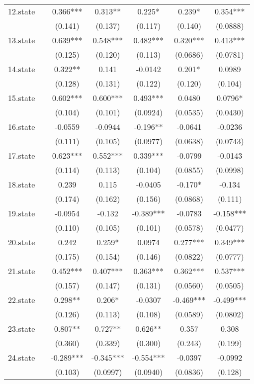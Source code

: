 \documentclass[]{article}
\begin{document}
\begin{tabular}{lcccccc}
12.state &  & 0.366*** & 0.313** & 0.225* & 0.239* & 0.354*** \\
 &  & (0.141) & (0.137) & (0.117) & (0.140) & (0.0888) \\
13.state &  & 0.639*** & 0.548*** & 0.482*** & 0.320*** & 0.413*** \\
 &  & (0.125) & (0.120) & (0.113) & (0.0686) & (0.0781) \\
14.state &  & 0.322** & 0.141 & -0.0142 & 0.201* & 0.0989 \\
 &  & (0.128) & (0.131) & (0.122) & (0.120) & (0.104) \\
15.state &  & 0.602*** & 0.600*** & 0.493*** & 0.0480 & 0.0796* \\
 &  & (0.104) & (0.101) & (0.0924) & (0.0535) & (0.0430) \\
16.state &  & -0.0559 & -0.0944 & -0.196** & -0.0641 & -0.0236 \\
 &  & (0.111) & (0.105) & (0.0977) & (0.0638) & (0.0743) \\
17.state &  & 0.623*** & 0.552*** & 0.339*** & -0.0799 & -0.0143 \\
 &  & (0.114) & (0.113) & (0.104) & (0.0855) & (0.0998) \\
18.state &  & 0.239 & 0.115 & -0.0405 & -0.170* & -0.134 \\
 &  & (0.174) & (0.162) & (0.156) & (0.0868) & (0.111) \\
19.state &  & -0.0954 & -0.132 & -0.389*** & -0.0783 & -0.158*** \\
 &  & (0.110) & (0.105) & (0.101) & (0.0578) & (0.0477) \\
20.state &  & 0.242 & 0.259* & 0.0974 & 0.277*** & 0.349*** \\
 &  & (0.175) & (0.154) & (0.146) & (0.0822) & (0.0777) \\
21.state &  & 0.452*** & 0.407*** & 0.363*** & 0.362*** & 0.537*** \\
 &  & (0.157) & (0.147) & (0.131) & (0.0560) & (0.0505) \\
22.state &  & 0.298** & 0.206* & -0.0307 & -0.469*** & -0.499*** \\
 &  & (0.126) & (0.113) & (0.108) & (0.0589) & (0.0802) \\
23.state &  & 0.807** & 0.727** & 0.626** & 0.357 & 0.308 \\
 &  & (0.360) & (0.339) & (0.300) & (0.243) & (0.199) \\
24.state &  & -0.289*** & -0.345*** & -0.554*** & -0.0397 & -0.0992 \\
 &  & (0.103) & (0.0997) & (0.0940) & (0.0836) & (0.128) \\

\end{tabular}
\end{document}
